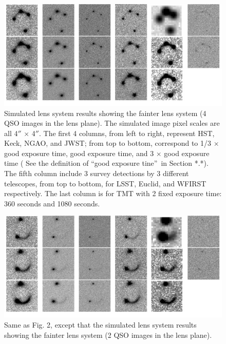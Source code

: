 \documentclass[a4paper,11pt]{article}
\begin{document}
\begin{figure}
\begin{center}
\includegraphics[width=1.0\textwidth]{figures/fainter_system_4QSOimages_all.png}
\end{center}
\caption{Simulated lens system results showing the fainter lens system (4 QSO images in the lens plane). The simulated image pixel scales are all 4$''$ $\times$ 4$''$. The first 4 columns, from left to right, represent HST, Keck, NGAO, and JWST; from top to bottom, correspond to 1/3 $\times$ good exposure time, good exposure time, and 3 $\times$ good exposure time ( See the definition of \textquotedblleft good exposure tine\textquotedblright\ in Section *.*). The fifth column include 3 survey detections by 3 different telescopes, from top to bottom, for LSST, Euclid, and WFIRST respectively. The last column is for TMT with 2 fixed exposure time: 360 seconds and 1080 seconds.}
\label{fig:fainter_4QSOimages_montage}
\end{figure}


\begin{figure}
\begin{center}
\includegraphics[width=1.0\textwidth]{figures/fainter_system_2QSOimages_all.png}
\end{center}
\caption{Same as Fig. 2, except that the simulated lens system results showing the fainter lens system (2 QSO images in the lens plane).}
\label{fig:fainter_2QSOimages_montage}
\end{figure}
\end{document}
